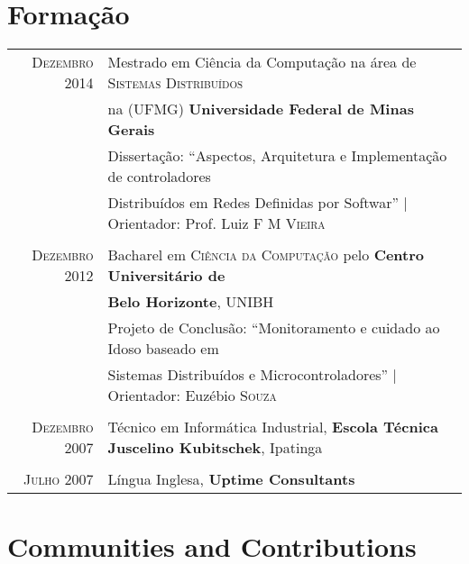 \documentclass[a4paper,10pt]{article} %
\begin{document}
\section{Formação}

\begin{tabular}{rl}	
\textsc{Dezembro} 2014 & Mestrado em Ciência da Computação na área de 
\textsc{Sistemas Distribuídos} 
\\ & na (UFMG) 
\textbf{Universidade Federal de Minas Gerais} \\
& Dissertação: ``Aspectos, Arquitetura e Implementação de controladores
\\ & Distribuídos em Redes Definidas por Softwar'' 
| \small Orientador: Prof. Luiz \textsc{F M Vieira} \\ 
&\\


\textsc{Dezembro} 2012& Bacharel em \textsc{Ciência da Computação}
pelo \normalsize\textbf{Centro Universitário de} 
\\ & \textbf{Belo Horizonte}, UNIBH \\
& Projeto de Conclusão: ``Monitoramento e cuidado ao Idoso baseado em 
\\ & Sistemas Distribuídos e Microcontroladores'' 
| \small Orientador: Euzébio \textsc{Souza} \\
&\\


\textsc{Dezembro} 2007 & Técnico em Informática Industrial, 
\textbf{Escola Técnica Juscelino Kubitschek}, Ipatinga \\
&\\


\textsc{Julho} 2007 & Língua Inglesa, \textbf{Uptime Consultants}
\end{tabular}





\section{Communities and Contributions}
\end{document}
